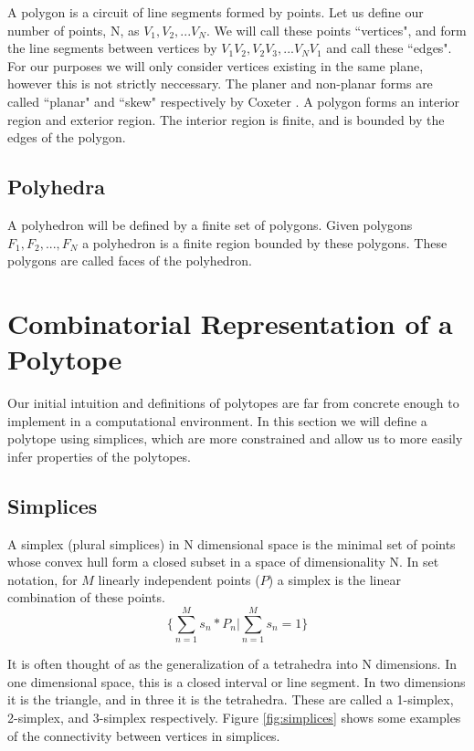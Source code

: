 A polygon is a circuit of line segments formed by points. Let us define our
number of points, N, as $V_1, V_2, ... V_N$. We will call these points
``vertices", and form the line segments between vertices by
$V_1 V_2, V_2 V_3, ... V_N V_1$
and call these ``edges". For our purposes we will only consider vertices existing
in the same plane, however this is not strictly neccessary. The planer and
non-planar forms are called ``planar" and ``skew" respectively by Coxeter
\cite{Coxeter}.
A polygon forms an interior region and exterior region. The interior region
is finite, and is bounded by the edges of the polygon.

\subsection{Polyhedra}

A polyhedron will be defined by a finite set of polygons. Given polygons
$F_1, F_2, ..., F_N$ a polyhedron is a finite region bounded by these polygons.
These polygons are called faces of the polyhedron. 


\section{Combinatorial Representation of a Polytope}

Our initial intuition and definitions of polytopes are far from concrete enough to
implement in a computational environment. In this section we will define a
polytope using simplices, which are more constrained and allow us to
more easily infer properties of the polytopes.

\subsection{Simplices}

A simplex (plural simplices) in N dimensional space is the minimal set of
points whose convex hull form a closed subset in a space of dimensionality N.
In set notation, for $M$ linearly independent points ($P$) a simplex is the
linear combination of these points.
\begin{equation}
\{\sum_{n=1}^{M}s_n*P_n | \sum_{n=1}^{M} s_n = 1\}
\end{equation}

It is often thought
of as the generalization of a tetrahedra into N dimensions. In one dimensional
space, this is a closed interval or line segment. In two dimensions it is the
triangle, and in three it is the tetrahedra. These are called a 1-simplex,
2-simplex, and 3-simplex respectively. Figure \ref{fig:simplices} shows
some examples of the connectivity between vertices in simplices.


